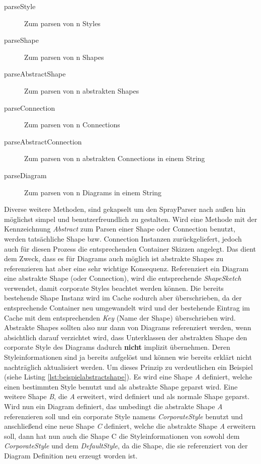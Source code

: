 \begin{description}
\item[parseStyle] Zum parsen von n Styles
\item[parseShape] Zum parsen von n Shapes
\item[parseAbstractShape] Zum parsen von n abstrakten Shapes
\item[parseConnection] Zum parsen von n Connections
\item[parseAbstractConnection] Zum parsen von n abstrakten Connections in einem String
\item[parseDiagram] Zum parsen von n Diagrams in einem String
\end{description}
Diverse weitere Methoden, sind gekapselt um den SprayParser nach außen hin möglichst simpel und benutzerfreundlich zu gestalten.
Wird eine Methode mit der Kennzeichnung \textit{Abstract} zum Parsen einer Shape oder Connection benutzt, werden tatsächliche Shape bzw. Connection Instanzen zurückgeliefert, jedoch auch für diesen Prozess die entsprechenden Container Skizzen angelegt. Das dient dem Zweck, dass es für Diagrams auch möglich ist abstrakte Shapes zu referenzieren hat aber eine sehr wichtige Konsequenz. Referenziert ein Diagram eine abstrakte Shape (oder Connection), wird die entsprechende \textit{ShapeSketch} verwendet, damit corporate Styles beachtet werden können. Die bereits bestehende Shape Instanz wird im Cache sodurch aber überschrieben, da der entsprechende Container neu umgewandelt wird und der bestehende Eintrag im Cache mit dem entsprechenden \textit{Key} (Name der Shape) überschrieben wird. Abstrakte Shapes sollten also nur dann von Diagrams referenziert werden, wenn absichtlich darauf verzichtet wird, dass Unterklassen der abstrakten Shape den corporate Style des Diagrams dadurch \textbf{nicht} implizit übernehmen. Deren Styleinformationen sind ja bereits aufgelöst und können wie bereits erklärt nicht nachträglich aktualisiert werden.
Um dieses Prinzip zu verdeutlichen ein Beispiel (siehe Listing \ref{lst:beispielabstractshape}). Es wird eine Shape \textit{A} definiert, welche einen bestimmten Style benutzt und als abstrakte Shape geparst wird. Eine weitere Shape \textit{B}, die \textit{A} erweitert, wird definiert und als normale Shape geparst. Wird nun ein Diagram definiert, das umbedingt die abstrakte Shape \textit{A} referenzieren soll und ein corporate Style namens \textit{CorporateStyle} benutzt und anschließend eine neue Shape \textit{C} definiert, welche die abstrakte Shape \textit{A} erweitern soll, dann hat nun auch die Shape C die Styleinformationen von sowohl dem \textit{CorporateStyle} und dem \textit{DefaultStyle}, da die Shape, die sie referenziert von der Diagram Definition neu erzeugt worden ist.
